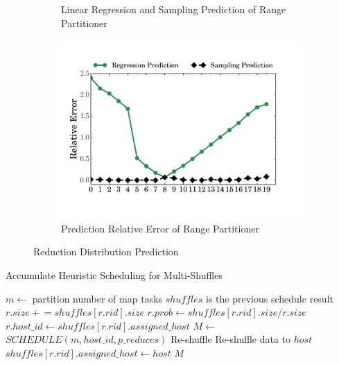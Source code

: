 \begin{figure}
\begin{subfigure}[b]{0.32\linewidth}
		\caption{Linear Regression and Sampling Prediction of Range Partitioner}
		\label{fig:range_pre_sample}
	\end{subfigure}
	\begin{subfigure}[b]{0.32\linewidth}
		\includegraphics[width=\linewidth]{fig/prediction_relative_error}
		\caption{Prediction Relative Error of Range Partitioner}
		\label{fig:prediction_relative_error}
	\end{subfigure}
	\caption{Reduction Distribution Prediction}
	\label{fig:dis}
\end{figure}

\begin{minipage}{\columnwidth}
\begin{algorithm}[H]
\caption{Accumulate Heuristic Scheduling for Multi-Shuffles}
\label{mhminheap}
	\begin{algorithmic}[1]
	\small
		\State $m\gets$ partition number of map tasks
		\Comment $shuffles$ is the previous schedule result 
			\State $r.size \mathrel{+}= shuffles\left[r.rid\right].size$
				\State $r.prob\gets shuffles\left[r.rid\right].size / r.size$
				\State $r.host\_id\gets shuffles\left[r.rid\right].assigned\_host$
			\EndIf
		\EndFor
		\State $M\gets$ $SCHEDULE\left(m, host\_id, p\_reduces\right)$
			\Comment Re-shuffle
				\State Re-shuffle data to $host$
				\State $shuffles\left[r.rid\right].assigned\_host\gets host$
				\EndIf
			\EndFor
		\EndFor
		\Return $M$
	\EndProcedure
	\end{algorithmic}
\end{algorithm}
\end{minipage}

